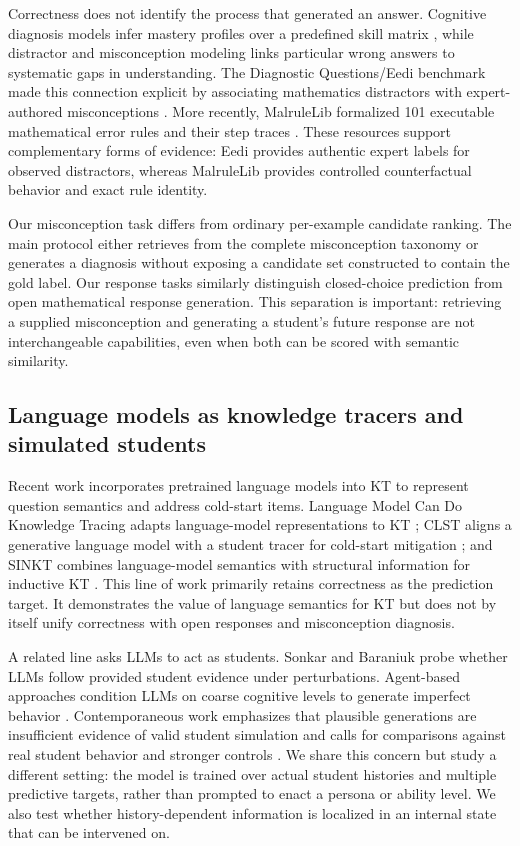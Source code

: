 Correctness does not identify the process that generated an answer.  Cognitive
diagnosis models infer mastery profiles over a predefined skill matrix
\citep{delatorre2009dina}, while distractor and misconception modeling links
particular wrong answers to systematic gaps in understanding.  The Diagnostic
Questions/Eedi benchmark made this connection explicit by associating
mathematics distractors with expert-authored misconceptions
\citep{wang2021diagnostic}.  More recently, MalruleLib formalized 101 executable
mathematical error rules and their step traces \citep{chen2026malrulelib}.  These
resources support complementary forms of evidence: Eedi provides authentic
expert labels for observed distractors, whereas MalruleLib provides controlled
counterfactual behavior and exact rule identity.

Our misconception task differs from ordinary per-example candidate ranking.
The main protocol either retrieves from the complete misconception taxonomy or
generates a diagnosis without exposing a candidate set constructed to contain
the gold label.  Our response tasks similarly distinguish closed-choice
prediction from open mathematical response generation.  This separation is
important: retrieving a supplied misconception and generating a student's
future response are not interchangeable capabilities, even when both can be
scored with semantic similarity.

\subsection{Language models as knowledge tracers and simulated students}

Recent work incorporates pretrained language models into KT to represent
question semantics and address cold-start items.  Language Model Can Do
Knowledge Tracing adapts language-model representations to KT
\citep{lee2024language}; CLST aligns a generative language model with a student
tracer for cold-start mitigation \citep{jung2024clst}; and SINKT combines
language-model semantics with structural information for inductive KT
\citep{fu2024sinkt}.  This line of work primarily retains correctness as the
prediction target.  It demonstrates the value of language semantics for KT but
does not by itself unify correctness with open responses and misconception
diagnosis.

A related line asks LLMs to act as students.  Sonkar and Baraniuk
\citeyearpar{sonkar2023deduction} probe whether LLMs follow provided student
evidence under perturbations.  Agent-based approaches condition LLMs on coarse
cognitive levels to generate imperfect behavior \citep{wu2025embracing}.
Contemporaneous work emphasizes that plausible generations are insufficient
evidence of valid student simulation and calls for comparisons against real
student behavior and stronger controls \citep{yuan2026valid}.  We share this
concern but study a different setting: the model is trained over actual student
histories and multiple predictive targets, rather than prompted to enact a
persona or ability level.  We also test whether history-dependent information
is localized in an internal state that can be intervened on.

